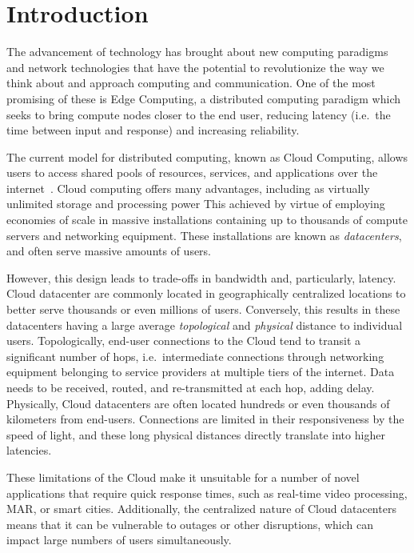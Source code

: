 \section{Introduction}


The advancement of technology has brought about new computing paradigms and network technologies that have the potential to revolutionize the way we think about and approach computing and communication.
One of the most promising of these is Edge Computing, a distributed computing paradigm which seeks to bring compute nodes closer to the end user, reducing latency (i.e.\ the time between input and response) and increasing reliability.

The current model for distributed computing, known as Cloud Computing, allows users to access shared pools of resources, services, and applications over the internet~\cite{gai2012towards}.
Cloud computing offers many advantages, including as virtually unlimited storage and processing power
This achieved by virtue of employing economies of scale in massive installations containing up to thousands of compute servers and networking equipment.
These installations are known as \emph{datacenters}, and often serve massive amounts of users.

However, this design leads to trade-offs in bandwidth and, particularly, latency.
Cloud datacenter are commonly located in geographically centralized locations to better serve thousands or even millions of users.
Conversely, this results in these datacenters having a large average \emph{topological} and \emph{physical} distance to individual users.
Topologically, end-user connections to the Cloud tend to transit a significant number of hops, i.e.\ intermediate connections through networking equipment belonging to service providers at multiple tiers of the internet.
Data needs to be received, routed, and re-transmitted at each hop, adding delay.
Physically, Cloud datacenters are often located hundreds or even thousands of kilometers from end-users.
Connections are limited in their responsiveness by the speed of light, and these long physical distances directly translate into higher latencies.

These limitations of the Cloud make it unsuitable for a number of novel applications that require quick response times, such as real-time video processing, \gls{MAR}, or smart cities.
Additionally, the centralized nature of Cloud datacenters means that it can be vulnerable to outages or other disruptions, which can impact large numbers of users simultaneously.

